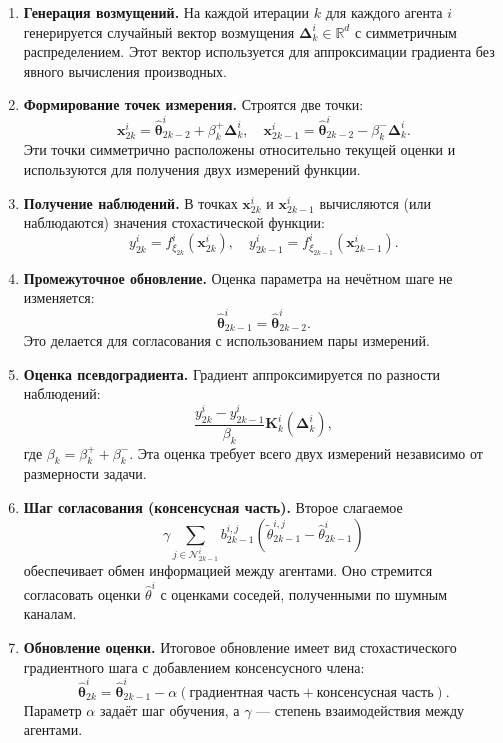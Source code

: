 \begin{enumerate}

\item \textbf{Генерация возмущений.}  
На каждой итерации $k$ для каждого агента $i$ генерируется случайный вектор возмущения $\boldsymbol{\Delta}_k^i \in \mathbb{R}^d$ с симметричным распределением. Этот вектор используется для аппроксимации градиента без явного вычисления производных.

\item \textbf{Формирование точек измерения.}  
Строятся две точки:
\[
\mathbf{x}_{2k}^i = \hat{\boldsymbol{\theta}}_{2k-2}^i + \beta_k^+ \boldsymbol{\Delta}_k^i, 
\quad
\mathbf{x}_{2k-1}^i = \hat{\boldsymbol{\theta}}_{2k-2}^i - \beta_k^- \boldsymbol{\Delta}_k^i.
\]
Эти точки симметрично расположены относительно текущей оценки и используются для получения двух измерений функции.

\item \textbf{Получение наблюдений.}  
В точках $\mathbf{x}_{2k}^i$ и $\mathbf{x}_{2k-1}^i$ вычисляются (или наблюдаются) значения стохастической функции:
\[
y_{2k}^i = f_{\xi_{2k}}^i(\mathbf{x}_{2k}^i), 
\quad
y_{2k-1}^i = f_{\xi_{2k-1}}^i(\mathbf{x}_{2k-1}^i).
\]

\item \textbf{Промежуточное обновление.}  
Оценка параметра на нечётном шаге не изменяется:
\[
\hat{\boldsymbol{\theta}}_{2k-1}^i = \hat{\boldsymbol{\theta}}_{2k-2}^i.
\]
Это делается для согласования с использованием пары измерений.

\item \textbf{Оценка псевдоградиента.}  
Градиент аппроксимируется по разности наблюдений:
\[
\frac{y_{2k}^i - y_{2k-1}^i}{\beta_k} \mathbf{K}_k^i(\boldsymbol{\Delta}_k^i),
\]
где $\beta_k = \beta_k^+ + \beta_k^-$.  
Эта оценка требует всего двух измерений независимо от размерности задачи.

\item \textbf{Шаг согласования (консенсусная часть).}  
Второе слагаемое
\[
\gamma \sum_{j \in \mathcal{N}_{2k-1}^i} b_{2k-1}^{i,j} 
(\tilde{\theta}_{2k-1}^{i,j} - \hat{\theta}_{2k-1}^i)
\]
обеспечивает обмен информацией между агентами. Оно стремится согласовать оценки $\hat{\theta}^i$ с оценками соседей, полученными по шумным каналам.

\item \textbf{Обновление оценки.}  
Итоговое обновление имеет вид стохастического градиентного шага с добавлением консенсусного члена:
\[
\hat{\boldsymbol{\theta}}_{2k}^i = \hat{\boldsymbol{\theta}}_{2k-1}^i - \alpha (\text{градиентная часть} + \text{консенсусная часть}).
\]
Параметр $\alpha$ задаёт шаг обучения, а $\gamma$ — степень взаимодействия между агентами.

\end{enumerate}

